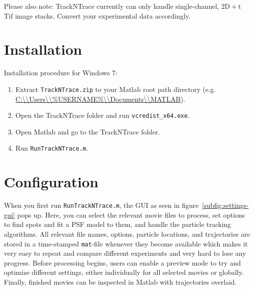 \documentclass[11pt,onside]{report}
\numberwithin{equation}{chapter}
\begin{document}
Please also note: TrackNTrace currently can only handle single-channel, $\mathrm{2D}+\mathrm{t}$ Tif image stacks. Convert your experimental data accordingly. \clearpage%

\section{Installation}\label{sec:install}
Installation procedure for Windows 7:
\begin{enumerate}
\item Extract \texttt{TrackNTrace.zip} to your Matlab root path directory (e.g. \url{C:\\Users\\\%USERNAME\%\\Documents\\MATLAB}).
\item Open the TrackNTrace folder and run \texttt{vcredist\_x64.exe}.
\item Open Matlab and go to the TrackNTrace folder.
\item Run \texttt{RunTrackNTrace.m}.
\end{enumerate}

\section{Configuration}\label{sec:config}
When you first run \texttt{RunTrackNTrace.m}, the GUI as seen in figure~\ref{subfig:settings-gui} pops up. Here, you can select the relevant movie files to process, set options to find spots and fit a PSF model to them, and handle the particle tracking algorithms. All relevant file names, options, particle locations, and trajectories are stored in a time-stamped \texttt{mat}-file whenever they become available which makes it very easy to repeat and compare different experiments and very hard to lose any progress. Before processing begins, users can enable a preview mode to try and optimize different settings, either individually for all selected movies or globally. Finally, finished movies can be inspected in Matlab with trajectories overlaid.
\end{document}
